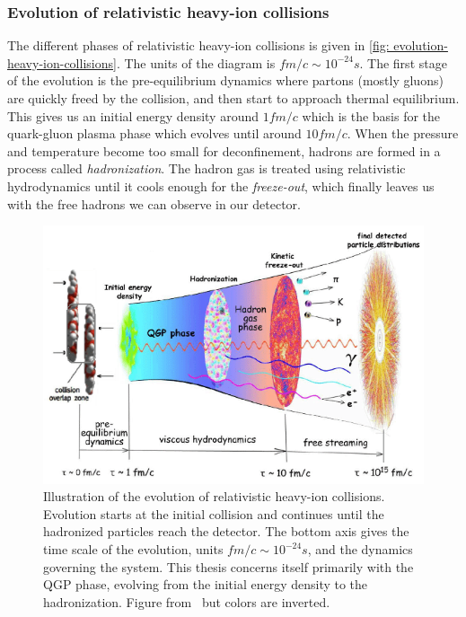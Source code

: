 \documentclass[main.tex]{subfiles}
\begin{document}
\subsubsection*{Evolution of relativistic heavy-ion collisions}
The different phases of relativistic heavy-ion collisions is given in \autoref{fig: evolution-heavy-ion-collisions}. The units of the diagram is \(fm/c\sim 10^{-24}s\). The first stage of the evolution is the pre-equilibrium dynamics where partons (mostly gluons) are quickly freed by the collision, and then start to approach thermal equilibrium. This gives us an initial energy density around \(1fm/c\) which is the basis for the quark-gluon plasma phase which evolves until around \(10fm/c\). When the pressure and temperature become too small for deconfinement, hadrons are formed in a process called \emph{hadronization}. The hadron gas is treated using relativistic hydrodynamics until it cools enough for the \textit{freeze-out}, which finally leaves us with the free hadrons we can observe in our detector. 
\begin{figure}[htb]
    \centering
    \includegraphics[width=12cm]{pictures/figures/evolution-of-relativistic-heavy-ion-collisions.png}
    \caption{Illustration of the evolution of relativistic heavy-ion collisions. Evolution starts at the initial collision and continues until the hadronized particles reach the detector. The bottom axis gives the time scale of the evolution, units \(fm/c \sim 10^{-24}s\), and the dynamics governing the system. This thesis concerns itself primarily with the QGP phase, evolving from the initial energy density to the hadronization. Figure from~\cite{QCD_figures/Scharenberg} but colors are inverted.}
    \label{fig: evolution-heavy-ion-collisions}
\end{figure}
\end{document}
